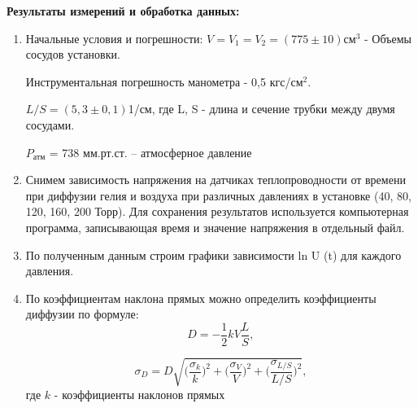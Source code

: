 \documentclass[a4paper, 12pt]{article}%
\begin{document}
\newpage

\textbf{Результаты измерений и обработка данных:}
\begin{enumerate}
\item Начальные условия и погрешности:
$V = V_1 = V_2 = (775\pm 10) \text{см}^3$ - Объемы сосудов установки.


Инструментальная погрешность манометра - 0,5 кгс/см$^2$.

$L/S = (5,3 \pm 0,1)$1/см,  где L, S - длина и сечение трубки между двумя сосудами.

$P_{\text{атм}}$ = 738 мм.рт.ст. -- атмосферное давление 

\item Снимем зависимость напряжения на датчиках теплопроводности от времени при диффузии гелия и воздуха при различных давлениях в установке (40, 80, 120, 160, 200 Торр). Для сохранения результатов используется компьютерная программа, записывающая время и значение напряжения в отдельный файл.

\item По полученным данным строим графики зависимости ln U (t) для каждого давления.

	\begin{figure}[h]
	\caption{}
\end{figure}

\item По коэффициентам наклона прямых можно определить коэффициенты диффузии по формуле: 
$$D = - \frac{1}{2} kV \frac{L}{S}, $$

$$ \sigma_D = D \sqrt{\big(\frac{\sigma_k}{k}\big)^2 + \big(\frac{\sigma_V }{V}\big)^2 + \big(\frac{\sigma_{L/S}}{L/S}\big)^2},$$ где $k$ - коэффициенты наклонов прямых


\end{enumerate}
\end{document}
